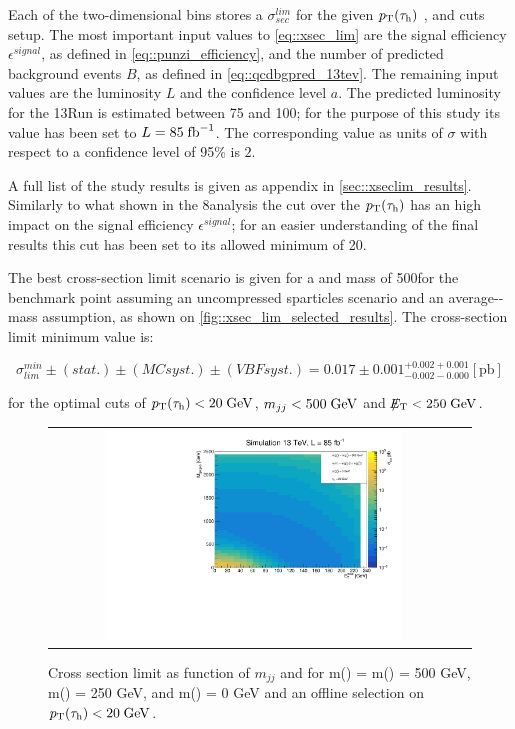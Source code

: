 Each of the two-dimensional bins stores a $\sigma^{lim}_{sec}$ for the given $p_{\text{T}}(\tau_{\text{h}})$ , \mjj and \met cuts setup. The most important input values to \autoref{eq::xsec_lim} are the signal efficiency $\epsilon^{signal}$, as defined in \autoref{eq::punzi_efficiency},  and the number of predicted background events $B$, as defined in \autoref{eq::qcdbgpred_13tev}. The remaining input values are the luminosity $L$ and the confidence level $a$. The predicted luminosity for the 13\tev Run \cite{Bruning:2002yh} is estimated between 75 and 100\invfb; for the purpose of this study its value has been set to $L = 85\;\text{fb}^{-1}$. The corresponding value as units of $\sigma$ with respect to a confidence level of 95\%  is $2$.

A full list of the study results is given as appendix in \autoref{sec::xseclim_results}. Similarly to what shown in the 8\tev analysis the cut over the $p_{\text{T}}(\tau_{\text{h}})$ has an high impact on the signal efficiency $\epsilon^{signal}$; for an easier understanding of the final results this cut has been set to its allowed minimum of 20\gev.

The best cross-section limit scenario is given for a \charginopm and \neutralinotwo mass of 500\gev for the benchmark point assuming an uncompressed sparticles scenario and an average-\stau-mass assumption, as shown on \autoref{fig::xsec_lim_selected_results}. The cross-section limit minimum value is:

\begin{equation}
\sigma_{lim}^{min}\pm(stat.)\pm(MC syst.)\pm(VBF syst.) = 0.017\pm0.001^{+0.002 + 0.001}_{-0.002-0.000} [\text{pb}]
\label{eq::xsec_lim_best_result}
\end{equation}

for the optimal cuts of  $p_{\text{T}}(\tau_{\text{h}}) <  20\;\text{Ge}\kern-0.06667em\text{V}$,  $ m_{jj}< 500\;\text{Ge}\kern-0.06667em\text{V} $ and $\slash\mkern-12mu{E}_{\text{T}} < 250\;\text{Ge}\kern-0.06667em\text{V}$.

\begin{figure}[tbh!]
	\centering
	\begin{tabular}{cc}
		\includegraphics[width=0.75\textwidth]{analysis/pics/JetInvMass_vs_MET_xseclim_Chargino500_Stau250_LSP000_taupt20.pdf}
	\end{tabular}
	\caption{Cross section limit as function of $m_{jj}$ and \met for m(\charginopm) = m(\neutralinotwo) = 500 GeV,  m(\stau) = 250 GeV, and m(\neutralinoone) = 0 GeV and an offline selection on $p_{\text{T}}(\tau_{\text{h}}) <  20\;\text{Ge}\kern-0.06667em\text{V}$.}
	\label{fig::xsec_lim_selected_results}
\end{figure}

